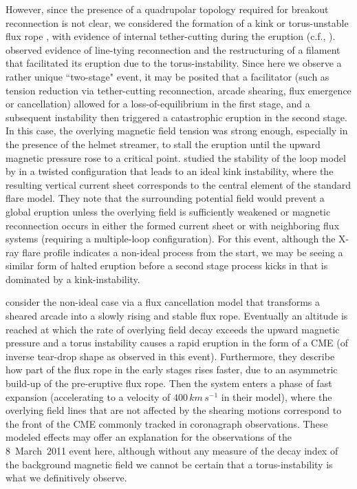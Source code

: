 \documentclass[namedreferences]{solarphysics}
\begin{document}
\begin{article}
However, since the presence of a quadrupolar topology required for breakout reconnection is not clear, we considered the formation of a kink or torus-unstable flux rope \cite{2004A&A...413L..27T,2010ApJ...708..314A}, with evidence of internal tether-cutting during the eruption (c.f., ).  observed evidence of line-tying reconnection and the restructuring of a filament that facilitated its eruption due to the torus-instability. Since here we observe a rather unique ``two-stage" event, it may be posited that a facilitator (such as tension reduction via tether-cutting reconnection, arcade shearing, flux emergence or cancellation) allowed for a loss-of-equilibrium in the first stage, and a subsequent instability then triggered a catastrophic eruption in the second stage. In this case, the overlying magnetic field tension was strong enough, especially in the presence of the helmet streamer, to stall the eruption until the upward magnetic pressure rose to a critical point.  studied the stability of the loop model by  in a twisted configuration that leads to an ideal kink instability, where the resulting vertical current sheet corresponds to the central element of the standard flare model. They note that the surrounding potential field would prevent a global eruption unless the overlying field is sufficiently weakened or magnetic reconnection occurs in either the formed current sheet or with neighboring flux systems (requiring a multiple-loop configuration). For this event, although the X-ray flare profile indicates a non-ideal process from the start, we may be seeing a similar form of halted eruption before a second stage process kicks in that is dominated by a kink-instability.

 consider the non-ideal case via a flux cancellation model that transforms a sheared arcade into a slowly rising and stable flux rope. Eventually an altitude is reached at which the rate of overlying field decay exceeds the upward magnetic pressure and a torus instability causes a rapid eruption in the form of a CME (of inverse tear-drop shape as observed in this event). Furthermore, they describe how part of the flux rope in the early stages rises faster, due to an asymmetric build-up of the pre-eruptive flux rope. Then the system enters a phase of fast expansion (accelerating to a velocity of $400\,km\,s^{-1}$ in their model), where the overlying field lines that are not affected by the shearing motions correspond to the front of the CME commonly tracked in coronagraph observations. These modeled effects may offer an explanation for the observations of the 8~March~2011 event here, although without any measure of the decay index of the background magnetic field we cannot be certain that a torus-instability is what we definitively observe.



\end{article}
\end{document}
